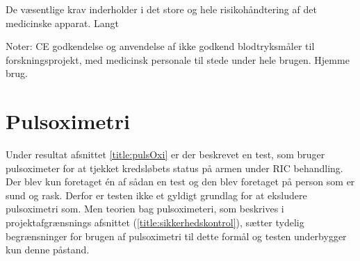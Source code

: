 De væsentlige krav inderholder i det store og hele risikohåndtering af det medicinske apparat. Langt

Noter: CE godkendelse og anvendelse af ikke godkend blodtryksmåler til forskningsprojekt, med medicinsk personale til stede under hele brugen. Hjemme brug.

\section{Pulsoximetri}
Under resultat afsnittet \ref{title:pulsOxi} er der beskrevet en test, som bruger pulsoximeter for at tjekket kredsløbets status på armen under RIC behandling. Der blev kun foretaget én af sådan en test og den blev foretaget på person som er sund og rask. Derfor er testen ikke et gyldigt grundlag for at eksludere pulsoximetri som. Men teorien bag pulsoximeteri, som beskrives i projektafgrænsnings afsnittet (\ref{title:sikkerhedskontrol}), sætter tydelig begrænsninger for brugen af pulsoximetri til dette formål og testen underbygger kun denne påstand. 



